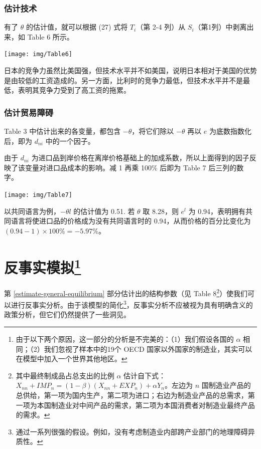 \documentclass[
]{article}
\begin{document}
\hypertarget{ux4f30ux8ba1ux6280ux672f}{%
\subsubsection{估计技术}\label{ux4f30ux8ba1ux6280ux672f}}

有了 \(\theta\) 的估计值，就可以根据 (27) 式将 \(T_i\)（第 2-4 列）从
\(S_i\)（第1列）中剥离出来，如 Table 6 所示。

\begin{center}\texttt{[image: img/Table6]} \end{center}

日本的竞争力虽然比美国强，但技术水平并不如美国，说明日本相对于美国的优势是由较低的工资造成的。另一方面，比利时的竞争力最低，但技术水平并不是最低，表明其竞争力受到了高工资的拖累。

\hypertarget{ux4f30ux8ba1ux8d38ux6613ux969cux788d}{%
\subsubsection{估计贸易障碍}\label{ux4f30ux8ba1ux8d38ux6613ux969cux788d}}

Table 3 中估计出来的各变量，都包含 \(-\theta\)，将它们除以 \(-\theta\) 再以
\(e\) 为底数指数化后，即为 \(d_{ni}\) 中的一个因子。

由于 \(d_{ni}\)
为进口品到岸价格在离岸价格基础上的加成系数，所以上面得到的因子反映了该变量对进口品成本的影响。减
1 再乘 100\% 后即为 Table 7 后三列的数字。

\begin{center}\texttt{[image: img/Table7]} \end{center}

以共同语言为例，\(-\theta l\) 的估计值为 0.51. 若 \(\theta\) 取 8.28，则 \(e^l\) 为
0.94，表明拥有共同语言将使进口品的价格成为没有共同语言时的
0.94，从而价格的百分比变化为 \((0.94-1)\times 100\%=-5.97\%\)。

\hypertarget{ux53cdux4e8bux5b9eux6a21ux62df17}{%
\section[反事实模拟]{\texorpdfstring{反事实模拟\footnote{由于以下两个原因，这一部分的分析是不完美的：（1）我们假设各国的 \(\alpha\) 相同；（2）我们忽视了样本中的19个 OECD 国家以外国家的制造业，其实可以在模型中加入一个世界其他地区。}}{反事实模拟}}\label{ux53cdux4e8bux5b9eux6a21ux62df17}}

第 \ref{estimate-general-equilibrium} 部分估计出的结构参数（见 Table
8\footnote{其中最终制成品占总支出的比例 \(\alpha\)
  估计自下式：\(X_{n n}+IMP_{n}=(1-\beta)\left(X_{n n}+EXP_{n}\right)+\alpha Y_{n}\)。左边为
  \(n\)
  国制造业产品的总供给，第一项为国内生产，第二项为进口；右边为制造业产品的总需求，第一项为本国制造业对中间产品的需求，第二项为本国消费者对制造业最终产品的需求。}）使我们可以进行反事实分析。由于该模型的简化\footnote{通过一系列很强的假设。例如，没有考虑制造业内部跨产业部门的地理障碍异质性。}，反事实分析不应被视为具有明确含义的政策分析，但它们仍然提供了一些洞见。
\end{document}
